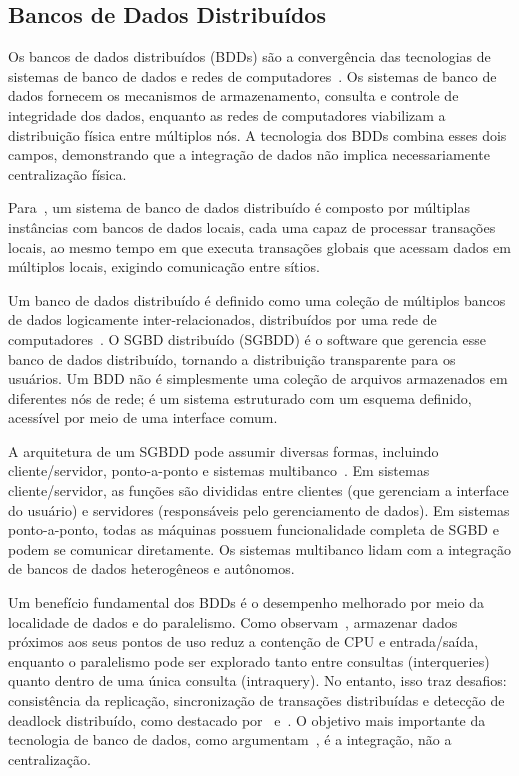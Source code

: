 \subsection{Bancos de Dados Distribuídos}

Os bancos de dados distribuídos (BDDs) são a convergência das tecnologias de sistemas de
banco de dados e redes de computadores~\citep{Ozsu2011}.
Os sistemas de banco de dados fornecem os mecanismos de armazenamento, consulta e controle
de integridade dos dados, enquanto as redes de computadores viabilizam a distribuição física
entre múltiplos nós. A tecnologia dos BDDs combina esses dois campos, demonstrando que a
integração de dados não implica necessariamente centralização física.

Para~\cite{silberschatz2020}, um sistema de banco de dados distribuído é composto por múltiplas
instâncias com bancos de dados locais, cada uma capaz de processar transações locais, ao mesmo
tempo em que executa transações globais que acessam dados em múltiplos locais, exigindo
comunicação entre sítios.

Um banco de dados distribuído é definido como uma coleção de múltiplos bancos de dados
logicamente inter-relacionados, distribuídos por uma rede de computadores~\citep{Ozsu2011}.
O SGBD distribuído (SGBDD) é o software que gerencia esse banco de dados distribuído, tornando
a distribuição transparente para os usuários. Um BDD não é simplesmente uma coleção de arquivos
armazenados em diferentes nós de rede; é um sistema estruturado com um esquema definido,
acessível por meio de uma interface comum.

A arquitetura de um SGBDD pode assumir diversas formas, incluindo cliente/servidor,
ponto-a-ponto e sistemas multibanco~\citep{Ozsu2011}. Em sistemas cliente/servidor, as funções
são divididas entre clientes (que gerenciam a interface do usuário) e servidores (responsáveis
pelo gerenciamento de dados). Em sistemas ponto-a-ponto, todas as máquinas possuem
funcionalidade completa de SGBD e podem se comunicar diretamente. Os sistemas multibanco lidam
com a integração de bancos de dados heterogêneos e autônomos.

Um benefício fundamental dos BDDs é o desempenho melhorado por meio da localidade de dados e
do paralelismo. Como observam~\cite{Ozsu2011}, armazenar dados próximos aos seus pontos de uso
reduz a contenção de CPU e entrada/saída, enquanto o paralelismo pode ser explorado tanto entre consultas
(interqueries) quanto dentro de uma única consulta (intraquery). No entanto, isso traz desafios:
consistência da replicação, sincronização de transações distribuídas e detecção de deadlock
distribuído, como destacado por~\cite{Ozsu2011} e~\cite{silberschatz2020}. O objetivo mais
importante da tecnologia de banco de dados, como argumentam~\cite{Ozsu2011}, é a integração,
não a centralização.

